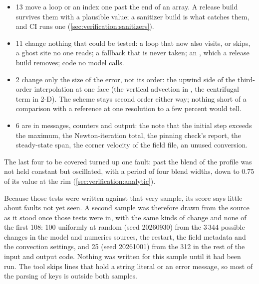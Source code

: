 \begin{itemize}
  \item 13 move a loop or an index one past the end of an array. A release
    build survives them with a plausible value; a sanitizer build is what
    catches them, and CI runs one (\cref{sec:verification:sanitizers}).
  \item 11 change nothing that could be tested: a loop that now also visits,
    or skips, a ghost site no one reads; a fallback that is never taken; an
    , which a release build removes; code no model calls.
  \item 2 change only the size of the error, not its order: the upwind side of
    the third-order interpolation at one face (the vertical advection in
    , the centrifugal term in 2-D). The scheme stays second order
    either way; nothing short of a comparison with a reference at one
    resolution to a few percent would tell.
  \item 6 are in messages, counters and output: the note that the initial
    step exceeds the maximum, the Newton-iteration total, the pinning check's
    report, the steady-state span, the corner velocity of the field file, an
    unused conversion.
\end{itemize}

The last four to be covered turned up one fault: past  the
blend of the  profile was not held constant but oscillated, with a
period of four blend widths, down to 0.75 of its value at the rim
(\cref{sec:verification:analytic}).

Because those tests were written against that very sample, its score says
little about faults not yet seen. A second sample was therefore drawn from the
source as it stood once those tests were in, with the same kinds of change and none of the first
108: 100 uniformly at random (seed 20260930) from the 3\,344 possible changes
in the model and numerics sources, the restart, the field metadata and the
convection settings, and 25 (seed 20261001) from the 312 in the rest of the
input and output code. Nothing was written for this sample until it had been
run. The tool skips lines that hold a string literal or an error message, so
most of the parsing of keys is outside both samples.

